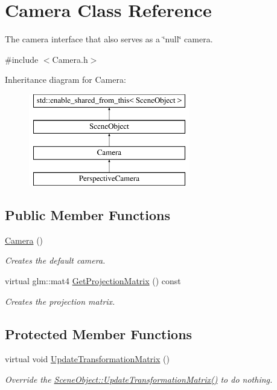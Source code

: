 \hypertarget{class_camera}{}\section{Camera Class Reference}
\label{class_camera}


The camera interface that also serves as a \char`\"{}null\char`\"{} camera.  




{\ttfamily \#include $<$Camera.\+h$>$}

Inheritance diagram for Camera\+:\begin{figure}[H]
\begin{center}
\leavevmode
\includegraphics[height=4.000000cm]{class_camera}
\end{center}
\end{figure}
\subsection*{Public Member Functions}
\begin{DoxyCompactItemize}
\item 
\hyperlink{class_camera_a01f94c3543f56ede7af49dc778f19331}{Camera} ()
\begin{DoxyCompactList}\small\item\em Creates the default camera. \end{DoxyCompactList}\item 
virtual glm\+::mat4 \hyperlink{class_camera_af6f4415189deaff158ba86f0b3527a30}{Get\+Projection\+Matrix} () const
\begin{DoxyCompactList}\small\item\em Creates the projection matrix. \end{DoxyCompactList}\end{DoxyCompactItemize}
\subsection*{Protected Member Functions}
\begin{DoxyCompactItemize}
\item 
virtual void \hyperlink{class_camera_aea640c892a3807671d8ca49616d96eda}{Update\+Transformation\+Matrix} ()
\begin{DoxyCompactList}\small\item\em Override the \hyperlink{class_scene_object_a20e31da3f9d2765de50cdb2d637ae6c9}{Scene\+Object\+::\+Update\+Transformation\+Matrix()} to do nothing. \end{DoxyCompactList}\end{DoxyCompactItemize}
